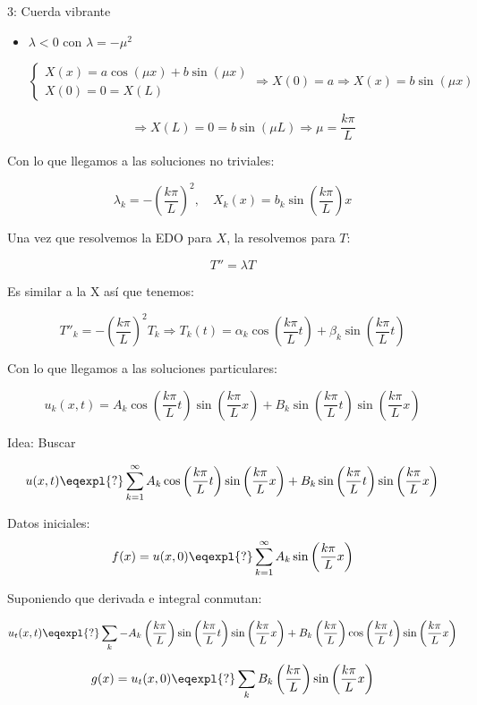 \begin{example}{3: Cuerda vibrante}
\begin{itemize}
				\item $\lambda < 0$ con $\lambda = -\mu^2$

					\[
					\left\{
					\begin{array}{l}
					X(x) = a\cos(\mu x) + b\sin(\mu x) \\
					X(0) = 0 = X(L)
					\end{array}
					\right.
					\Rightarrow X(0) = a \Rightarrow X(x) = b \sin(\mu x)
					\]

					\[ \Rightarrow X(L) = 0 = b \sin (\mu L) \Rightarrow \mu = \frac{k \pi}{L}\]

			\end{itemize}

			Con lo que llegamos a las soluciones no triviales:

			\[\lambda_k = - (\frac{k\pi}{L})^2, \quad X_k(x) = b_k \sin \left(\frac{k\pi}{L} \right) x\]


			Una vez que resolvemos la EDO para $X$, la resolvemos para $T$:

			\[T'' = \lambda T\]

			Es similar a la X así que tenemos:

			\[T''_k = - (\frac{k\pi}{L})^2 T_k \Rightarrow T_k (t) = \alpha_k \cos\left( \frac{k \pi}{L} t \right) + \beta_k \sin \left( \frac{k \pi}{L}t \right)\]

			Con lo que llegamos a las soluciones particulares:

			\[u_k(x,t) = A_k \cos \left(\frac{k\pi}{L} t\right) \sin \left(\frac{k\pi}{L}x\right) + B_k \sin \left(\frac{k\pi}{L}t\right)  \sin \left(\frac{k\pi}{L}x\right) \]

			Idea: Buscar

			\[u(x,t) \eqexpl{?} \sum_{k=1}^{\infty} A_k \cos \left(\frac{k\pi}{L} t\right) \sin \left(\frac{k\pi}{L} x  \right)+ B_k \sin \left(\frac{k\pi}{L}t \right) \sin \left(\frac{k\pi}{L}  x \right)\]

			Datos iniciales:
			\[ f(x) = u(x,0) \eqexpl{?} \sum^{\infty}_{k=1} A_k \sin \left(\frac{k\pi}{L} x  \right)\]

			Suponiendo que derivada e integral conmutan:

			\[ u_t (x,t) \eqexpl{?} \sum_{k} - A_k \left(\frac{k\pi}{L} \right) \sin \left(\frac{k\pi}{L}t \right) \sin \left(\frac{k\pi}{L}x \right) + B_k \left(\frac{k\pi}{L} \right) \cos \left(\frac{k\pi}{L}t \right) \sin \left(\frac{k\pi}{L}x \right)
			\]

			\[g(x) = u_t(x,0) \eqexpl{?} \sum_k B_k  \left(\frac{k\pi}{L} \right) \sin \left(\frac{k\pi}{L}x \right)\]

		\end{example}

